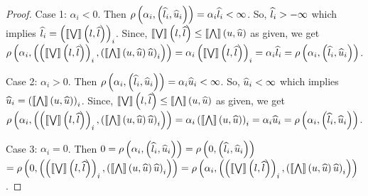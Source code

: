 \begin{proof}
Case 1: $\alpha_i< 0$.  Then
$\supp{\alpha_i}{\lt(\plb_i,\pub_i\rt)}=\alpha_i\plb_i<\infty$.  So,
$\plb_i>-\infty$ which implies $\plb_i=\lt(\maxapprox{\lb}{\plb}\rt)_i$.
Since, $\maxapprox{\lb}{\plb}\leq\minapprox{\ub}{\pub}$ as given, we
get
$\supp{\alpha_i}{\lt(\lt(\maxapprox{\lb}{\plb}\rt)_i,\lt(\minapprox{\ub}{\pub}\pub\rt)_i\rt)}
=\alpha_i\lt(\maxapprox{\lb}{\plb}\rt)_i
=\alpha_i\plb_i=\supp{\alpha_i}{\lt(\plb_i,\pub_i\rt)}$.

Case 2: $\alpha_i> 0$.  Then
$\supp{\alpha_i}{\lt(\plb_i,\pub_i\rt)}=\alpha_i\pub_i<\infty$.  So,
$\pub_i<\infty$ which implies $\pub_i=\lt(\minapprox{\ub}{\pub}\rt)_i$.
Since, $\maxapprox{\lb}{\plb}\leq\minapprox{\ub}{\pub}$ as given, we
get
$\supp{\alpha_i}{\lt(\lt(\maxapprox{\lb}{\plb}\rt)_i,\lt(\minapprox{\ub}{\pub}\pub\rt)_i\rt)}=
\alpha_i\lt(\minapprox{\ub}{\pub}\rt)_i
=\alpha_i\pub_i=\supp{\alpha_i}{\lt(\plb_i,\pub_i\rt)}$.

Case 3: $\alpha_i=0$.  Then
$0=\supp{\alpha_i}{\lt(\plb_i,\pub_i\rt)}=\supp{0}{\lt(\plb_i,\pub_i\rt)}$\\
$=
\supp{0}{\lt(\lt(\maxapprox{\lb}{\plb}\rt)_i,\lt(\minapprox{\ub}{\pub}\pub\rt)_i\rt)}
= \supp{\alpha_i}{\lt(\lt(\maxapprox{\lb}{\plb}\rt)_i,\lt(\minapprox{\ub}{\pub}\pub\rt)_i\rt)}$.


\end{proof}
